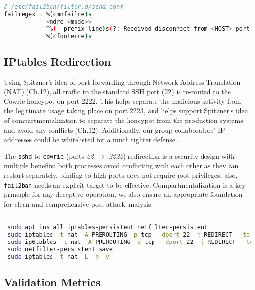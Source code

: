 \documentclass{cls/ULBreport}
\begin{document}
        \begin{lstlisting}[language=bash,caption={Regex Filter Against Key-Based Attacks}]
 # /etc/fail2ban/filter.d/sshd.conf
failregex = %(cmnfailre)s
            <mdre-<mode>>
            ^%(__prefix_line)s(?: Received disconnect from <HOST> port \d+: Too many authentication failures | Disconnected from <HOST> port \d+ due to: Authentication failed for .* publickey )
            %(cfooterre)s
        \end{lstlisting}
        
        
        \subsection{IPtables Redirection}
        Using Spitzner's idea of port forwarding through Network Address Translation (NAT) (Ch.12), all traffic to the standard SSH port (22) is re-routed to the Cowrie honeypot on port 2222. This helps separate the malicious activity from the legitimate usage taking place on port 2223, and helps support Spitzner's idea of compartmentalization to separate the honeypot from the production systems and avoid any conflicts (Ch.12). Additionally, our group collaborators' IP addresses could be whitelisted for a much tighter defense. 
        
        The \texttt{sshd} to \texttt{cowrie} ({ports \textit{22}} $\rightarrow$ \textit{2222}) redirection is a security design with multiple benefits: both processes avoid conflicting with each other as they can restart separately, binding to high ports does not require root privileges, also, \texttt{fail2ban} needs an explicit target to be effective. Compartmentalization is a key principle for any deceptive operation, we also ensure an appropriate foundation for clean and comprehensive post-attack analysis.
        \begin{lstlisting}[language=bash,caption={Traffic Redirection to Cowrie}]

 sudo apt install iptables-persistent netfilter-persistent
 sudo iptables -t nat -A PREROUTING -p tcp --dport 22 -j REDIRECT --to-port 2222
 sudo ip6tables -t nat -A PREROUTING -p tcp --dport 22 -j REDIRECT --to-port 2222
 sudo netfilter-persistent save
 sudo iptables -t nat -L -n -v
        \end{lstlisting}
        

        
        \subsection{Validation Metrics}  
        \label{sec:validation}  
        
\end{document}
